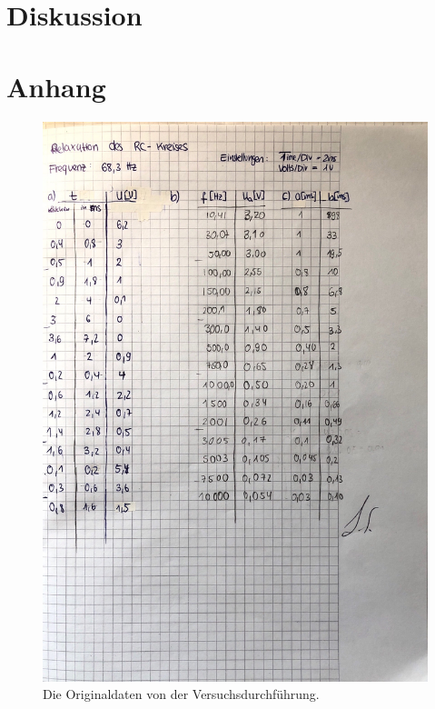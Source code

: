 \section{Diskussion}
\label{sec:Diskussion}

\section{Anhang}
\begin{figure}
    \centering
    \includegraphics[width=\textwidth]{bilder/daten_V353.pdf}
    \caption{Die Originaldaten von der Versuchsdurchführung.}
\end{figure}